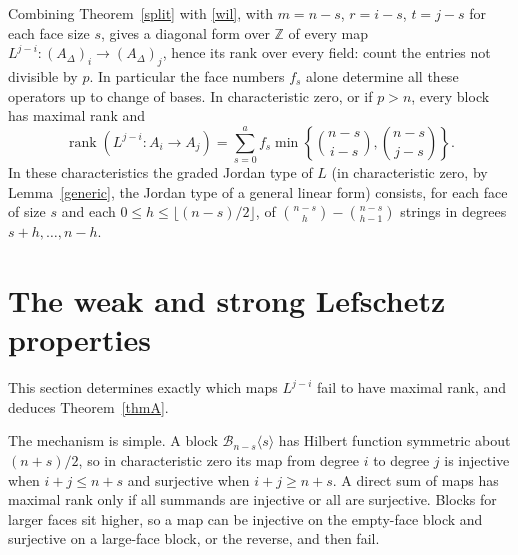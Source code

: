 \documentclass[11pt,a4paper]{article}
\theoremstyle{definition}
\newcommand{\rk}{\operatorname{rank}}
\newcommand{\B}{\mathcal B}
\begin{document}
Combining Theorem~\ref{split} with \eqref{wil}, with $m=n-s$, $r=i-s$, $t=j-s$ for each face size $s$, gives a diagonal form over $\mathbb Z$ of every map $L^{j-i}:(A_\Delta)_i\to(A_\Delta)_j$, hence its rank over every field: count the entries not divisible by $p$. In particular the face numbers $f_s$ alone determine all these operators up to change of bases. In characteristic zero, or if $p>n$, every block has maximal rank and
\begin{equation}\label{rankformula}
 \rk(L^{j-i}:A_i\to A_j)=\sum_{s=0}^af_s\min\left\{\binom{n-s}{i-s},\binom{n-s}{j-s}\right\}.
\end{equation}
In these characteristics the graded Jordan type of $L$ (in characteristic zero, by Lemma~\ref{generic}, the Jordan type of a general linear form) consists, for each face of size $s$ and each $0\le h\le\lfloor(n-s)/2\rfloor$, of $\binom{n-s}h-\binom{n-s}{h-1}$ strings in degrees $s+h,\dots,n-h$.

\section{The weak and strong Lefschetz properties}\label{sec:wlp}

This section determines exactly which maps $L^{j-i}$ fail to have maximal rank, and deduces Theorem~\ref{thmA}.

The mechanism is simple. A block $\B_{n-s}\langle s\rangle$ has Hilbert function symmetric about $(n+s)/2$, so in characteristic zero its map from degree $i$ to degree $j$ is injective when $i+j\le n+s$ and surjective when $i+j\ge n+s$. A direct sum of maps has maximal rank only if all summands are injective or all are surjective. Blocks for larger faces sit higher, so a map can be injective on the empty-face block and surjective on a large-face block, or the reverse, and then fail.
\end{document}
